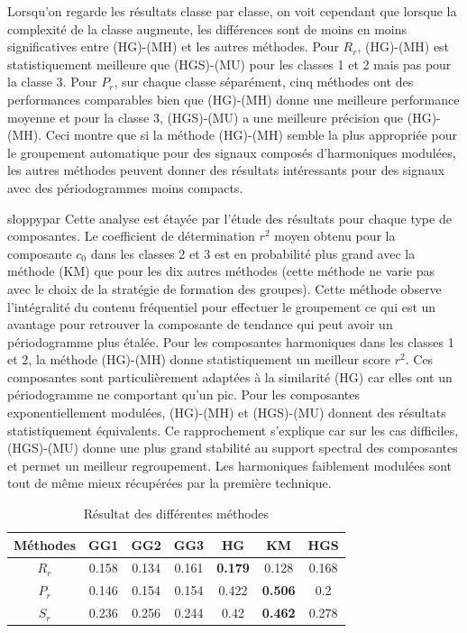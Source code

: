 \documentclass{gretsi}
\begin{document}
Lorsqu'on regarde les résultats classe par classe, on voit cependant que lorsque la complexité de la classe augmente, les différences sont de moins en moins significatives entre (HG)-(MH) et les autres méthodes.
Pour $R_r$, (HG)-(MH) est statistiquement meilleure que (HGS)-(MU) pour les classes 1 et 2 mais pas pour la classe 3.
Pour $P_r$, sur chaque classe séparément, cinq méthodes ont des performances comparables bien que (HG)-(MH) donne une meilleure performance moyenne et pour la classe 3, (HGS)-(MU) a une meilleure précision que (HG)-(MH).
Ceci montre que si la méthode (HG)-(MH) semble la plus appropriée pour le groupement automatique pour des signaux composés d'harmoniques modulées, les autres méthodes peuvent donner des résultats intéressants pour des signaux avec des périodogrammes moins compacts.



\begin{sloppypar}sloppypar
Cette analyse est étayée par l'étude des résultats pour chaque type de composantes.
Le coefficient de détermination $r^2$ moyen obtenu pour la composante $c_0$ dans les classes 2 et 3 est en probabilité plus grand avec la méthode (KM) que pour les dix autres méthodes (cette méthode ne varie pas avec le choix de la stratégie de formation des groupes). 
Cette méthode observe l'intégralité du contenu fréquentiel pour effectuer le groupement ce qui est un avantage pour retrouver la composante de tendance qui peut avoir un périodogramme plus étalée. 
Pour les composantes harmoniques dans les classes 1 et 2, la méthode (HG)-(MH) donne statistiquement un meilleur score $r^2$. 
Ces composantes sont particulièrement adaptées à la similarité (HG) car elles ont un périodogramme ne comportant qu'un pic.
Pour les composantes exponentiellement modulées, (HG)-(MH) et (HGS)-(MU) donnent des résultats statistiquement équivalents. Ce rapprochement s'explique car sur les cas difficiles, (HGS)-(MU) donne une plus grand stabilité au support spectral des composantes et permet un meilleur regroupement. Les harmoniques faiblement modulées sont tout de même mieux récupérées par la première technique.
\end{sloppypar}


\begin{table}[h]
\begin{tabular}{|c|c|c|c|c|c|c|}
	\hline
	Méthodes & GG1 & GG2 & GG3 & HG & KM & HGS\\\hline 
	$R_r$ & 0.158& 0.134& 0.161& \textbf{0.179}& 0.128& 0.168\\\hline 
	$P_r$ & 0.146& 0.154& 0.154& 0.422& \textbf{0.506}& 0.2\\\hline 
	$S_r$ & 0.236& 0.256& 0.244& 0.42& \textbf{0.462}& 0.278\\\hline 
\end{tabular}
\caption{Résultat des différentes méthodes }
\label{tab:res}
\end{table}
\end{document}
